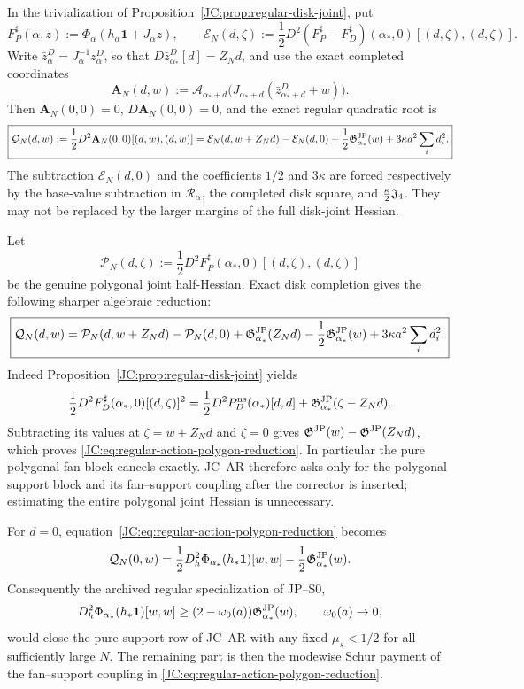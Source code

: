 \begin{contract}
\label{JC:con:JC-AR}
In the trivialization of Proposition~\ref{JC:prop:regular-disk-joint}, put
\[
 F_P^\sharp(\alpha,z)
 :=\Phi_\alpha(h_\alpha\mathbf1+J_\alpha z),
 \qquad
 \mathcal E_N(d,\zeta)
 :=\frac12D^2(F_P^\sharp-F_D^\sharp)(\alpha_*,0)
 [(d,\zeta),(d,\zeta)].
\]
Write \(\bar z_\alpha^D=J_\alpha^{-1}z_\alpha^D\), so that
\(D\bar z_{\alpha_*}^D[d]=Z_Nd\), and use the exact completed coordinates
\[
 \mathbf A_N(d,w):=
 \mathscr A_{\alpha_*+d}
 \bigl(J_{\alpha_*+d}(\bar z_{\alpha_*+d}^D+w)\bigr).
\]
Then \(\mathbf A_N(0,0)=0\), \(D\mathbf A_N(0,0)=0\), and the exact
regular quadratic root is
\begin{equation}\label{JC:eq:regular-action-root}
 \boxed{
 \mathcal Q_N(d,w):=\frac12D^2\mathbf A_N(0,0)[(d,w),(d,w)]
 =\mathcal E_N(d,w+Z_Nd)-\mathcal E_N(d,0)
 +\frac12\mathfrak G^{\rm JP}_{\alpha_*}(w)
 +3\kappa a^2\sum_i d_i^2.}
\end{equation}
The subtraction \(\mathcal E_N(d,0)\) and the coefficients
\(1/2\) and \(3\kappa\) are forced respectively by the base-value
subtraction in \(\mathscr R_\alpha\), the completed disk square, and
\(\frac\kappa2\mathfrak J_4\).  They may not be replaced by the larger margins
of the full disk-joint Hessian.

Let
\[
 \mathcal P_N(d,\zeta):=
 \frac12D^2F_P^\sharp(\alpha_*,0)
 [(d,\zeta),(d,\zeta)]
\]
be the genuine polygonal joint half-Hessian.  Exact disk completion gives
the following sharper algebraic reduction:
\begin{equation}\label{JC:eq:regular-action-polygon-reduction}
 \boxed{
 \mathcal Q_N(d,w)=
 \mathcal P_N(d,w+Z_Nd)-\mathcal P_N(d,0)
 +\mathfrak G^{\rm JP}_{\alpha_*}(Z_Nd)-\frac12\mathfrak G^{\rm JP}_{\alpha_*}(w)
 +3\kappa a^2\sum_i d_i^2.}
\end{equation}
Indeed Proposition~\ref{JC:prop:regular-disk-joint} yields
\[
 \frac12D^2F_D^\sharp(\alpha_*,0)[(d,\zeta)]^2
 =\frac12D^2P_D^{\rm ns}(\alpha_*)[d,d]
  +\mathfrak G^{\rm JP}_{\alpha_*}(\zeta-Z_Nd).
\]
Subtracting its values at $\zeta=w+Z_Nd$ and $\zeta=0$ gives
$\mathfrak G^{\rm JP}(w)-\mathfrak G^{\rm JP}(Z_Nd)$, which proves
\eqref{JC:eq:regular-action-polygon-reduction}.  In particular the pure
polygonal fan block cancels exactly.  JC--AR therefore asks only for the
polygonal support block and its fan--support coupling after the corrector
is inserted; estimating the entire polygonal joint Hessian is unnecessary.

For $d=0$, equation~\eqref{JC:eq:regular-action-polygon-reduction} becomes
\begin{equation}\label{JC:eq:regular-action-pure-support-identity}
 \mathcal Q_N(0,w)=
 \frac12D_h^2\Phi_{\alpha_*}(h_*\mathbf1)[w,w]
 -\frac12\mathfrak G^{\rm JP}_{\alpha_*}(w).
\end{equation}
Consequently the archived regular specialization of JP--S0,
\[
 D_h^2\Phi_{\alpha_*}(h_*\mathbf1)[w,w]
 \ge(2-\omega_0(a))\mathfrak G^{\rm JP}_{\alpha_*}(w),
 \qquad \omega_0(a)\to0,
\]
would close the pure-support row of JC--AR with any fixed
$\mu_s<1/2$ for all sufficiently large $N$.  The remaining part is then
the modewise Schur payment of the fan--support coupling in
\eqref{JC:eq:regular-action-polygon-reduction}.


\end{contract}
